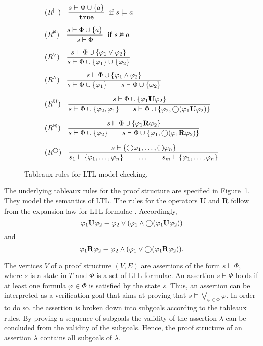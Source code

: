\documentclass[a4paper, 12pt, twoside]{report}
\begin{document}
	\begin{figure}
		\begin{align*}
			&(R^{\models}) \quad \frac{s \vdash \Phi \cup \{a\}}{\texttt{true}} \; \text{ if } s \models a \\[1.5ex]
			&(R^{\nvDash}) \quad \frac{s \vdash \Phi \cup \{a\}}{s \vdash \Phi} \; \text{ if } s \nvDash a \\[1.5ex]
			&(R^{\vee}) \quad \frac{s \vdash \Phi \cup \{\varphi_1 \vee \varphi_2\}}{s \vdash \Phi \cup \{\varphi_1\} \cup \{\varphi_2\}}\\[1ex]
			&(R^{\wedge}) \quad \frac{s \vdash \Phi \cup \{\varphi_1 \wedge \varphi_2\}}{s \vdash \Phi \cup \{\varphi_1\} \qquad s \vdash \Phi\cup \{\varphi_2\}}\\[1.5ex]
			&(R^{\text{\textbf{U}}}) \quad \frac{s \vdash \Phi \cup \{\varphi_1 \text{\textbf{U}} \varphi_2\}}{s \vdash \Phi \cup \{\varphi_2, \varphi_1\} \qquad s \vdash \Phi\cup \{\varphi_2, \bigcirc(\varphi_1 \text{\textbf{U}} \varphi_2)\}}\\[1.5ex]
			&(R^{\text{\textbf{R}}}) \quad \frac{s \vdash \Phi \cup \{\varphi_1 \text{\textbf{R}} \varphi_2\}}{s \vdash \Phi \cup \{\varphi_2\} \qquad s \vdash \Phi\cup \{\varphi_1, \bigcirc(\varphi_1 \text{\textbf{R}} \varphi_2)\}}\\[1.5ex]
			&(R^{\bigcirc}) \quad \frac{s \vdash \{\bigcirc \varphi_1, \dots, \bigcirc \varphi_n\}}{s_1 \vdash \{\varphi_1, \dots, \varphi_n\} \qquad \dots \qquad s_m \vdash \{\varphi_1, \dots, \varphi_n\}}\\
			\end{align*}
		\caption{Tableaux rules for LTL model checking.}\label{fig:tableaux_rules}
	\end{figure}

	The underlying tableaux rules for the proof structure are specified in Figure~\ref{fig:tableaux_rules}. They model the semantics of LTL. The rules for the operators \textbf{U} and \textbf{R} follow from the expansion law for LTL formulae \cite{baier2008principles}. Accordingly,
	\[\varphi_1 \text{\textbf{U}} \varphi_2 \equiv \varphi_2 \vee (\varphi_1 \wedge \bigcirc (\varphi_1 \text{\textbf{U}} \varphi_2))\] and
	\[\varphi_1 \text{\textbf{R}} \varphi_2 \equiv \varphi_2 \wedge (\varphi_1 \vee \bigcirc (\varphi_1 \text{\textbf{R}} \varphi_2)).\]	
	
	The vertices $V$ of a proof structure $(V,E)$ are assertions of the form $s \vdash \Phi$, where $s$ is a state in $T$ and $\Phi$ is a set of LTL formulae. An assertion $s \vdash \Phi$ holds if at least one formula $\varphi \in \Phi$ is satisfied by the state $s$. Thus, an assertion can be interpreted as a verification goal that aims at proving that $s\models \bigvee_{\varphi \in \Phi}\varphi$. In order to do so, the assertion is broken down into subgoals according to the tableaux rules. By proving a sequence of subgoals the validity of the assertion $\lambda$ can be concluded from the validity of the subgoals. Hence, the proof structure of an assertion $\lambda$ contains all subgoals of $\lambda$. \\
	
\end{document}
